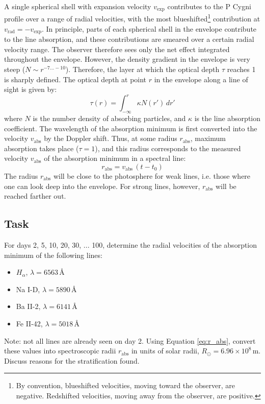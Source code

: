 \documentclass{article}
\begin{document}
A single spherical shell with expansion velocity $v_\text{exp}$ contributes to the P Cygni profile over a range of radial velocities, with the most blueshifted\footnote{By convention, blueshifted velocities, moving toward the observer, are negative. Redshifted velocities, moving away from the observer, are positive.} contribution at $v_\text{rad} = -v_\text{exp}$.
In principle, parts of each spherical shell in the envelope contribute to the line absorption, and these contributions are smeared over a certain radial velocity range.
The observer therefore sees only the net effect integrated throughout the envelope.
However, the density gradient in the envelope is very steep ($N \sim r^{-7...-10}$).
Therefore, the layer at which the optical depth $\tau$ reaches 1 is sharply defined.
The optical depth at point $r$ in the envelope along a line of sight is given by:
\begin{equation}
    \tau(r) = \int_{-\infty}^{r} \kappa N(r')\,dr'
\end{equation}
where $N$ is the number density of absorbing particles, and $\kappa$ is the line absorption coefficient.
The wavelength of the absorption minimum is first converted into the velocity $v_\text{abs}$ by the Doppler shift.
Thus, at some radius $r_\text{abs}$, maximum absorption takes place ($\tau = 1$), and this radius corresponds to the measured velocity $v_\text{abs}$ of the absorption minimum in a spectral line:
\begin{equation}
    r_\text{abs} = v_\text{abs}\,(t - t_0)
    \label{eq:r_abs}
\end{equation}
The radius $r_\text{abs}$ will be close to the photosphere for weak lines, i.e. those where one can look deep into the envelope. 
For strong lines, however, $r_\text{abs}$ will be reached farther out.

\subsection{Task}
For days 2, 5, 10, 20, 30, ... 100, determine the radial velocities of the absorption minimum of the following lines:
\begin{itemize}
    \item $H_\alpha$, $\lambda=6563$\,\AA
    \item Na I-D, $\lambda=5890$\,\AA
    \item Ba II-2, $\lambda=6141$\,\AA
    \item Fe II-42, $\lambda=5018$\,\AA
\end{itemize}
Note: not all lines are already seen on day 2.
Using Equation \ref{eq:r_abs}, convert these values into spectroscopic radii $r_{\text{abs}}$ in units of solar radii, $R_\odot=6.96\times 10^8$\,m.
Discuss reasons for the stratification found.
\end{document}
